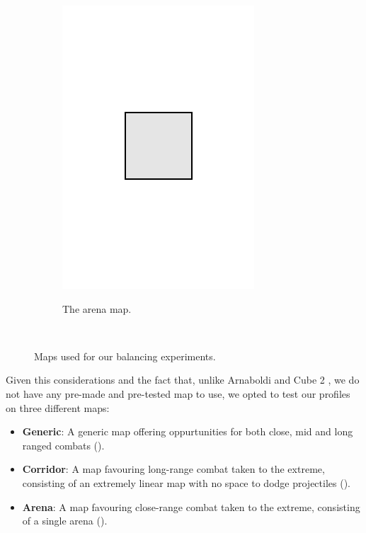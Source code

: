 \begin{figure}[hbtp]
\begin{subfigure}[t]{0.3\textwidth}
	\includegraphics[width=\linewidth]{Images/images/heatmaps/map_arena.png}
	\label{fig:arena_map}
	\caption{The arena map.}
\end{subfigure}
~
\caption{Maps used for our balancing experiments.}
\end{figure}

Given this considerations and the fact that, unlike Arnaboldi and Cube 2 \citep{arnaboldi_framework}, we do not have any pre-made and pre-tested map to use, we opted to test our profiles on three different maps:
\begin{itemize}
\item \textbf{Generic}: A generic map offering oppurtunities for both close, mid and long ranged combats ().
\item \textbf{Corridor}: A map favouring long-range combat taken to the extreme, consisting of an extremely linear map with no space to dodge projectiles ().
\item \textbf{Arena}: A map favouring close-range combat taken to the extreme, consisting of a single arena ().
\end{itemize}

